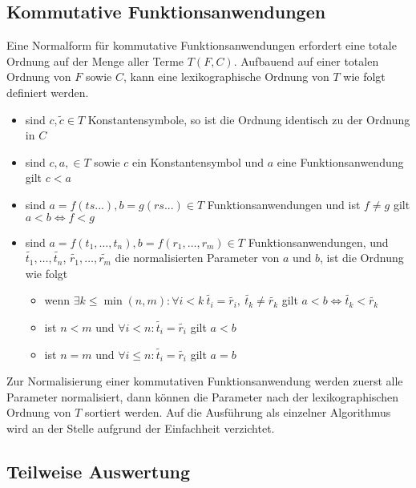 \documentclass{scrartcl}
\numberwithin{figure}{section} %
\theoremstyle{definition} %
\begin{document}
\subsection{Kommutative Funktionsanwendungen} \label{subsecNormalSortieren}
Eine Normalform für kommutative Funktionsanwendungen erfordert eine totale Ordnung auf der Menge aller Terme $T(F, C)$. Aufbauend auf einer totalen Ordnung von $F$ sowie $C$, kann eine lexikographische Ordnung von $T$ wie folgt definiert werden. 
\begin{itemize}
	\item{sind $c, \tilde{c} \in T$ Konstantensymbole, so ist die Ordnung identisch zu der Ordnung in $C$}
	\item{sind $c, a, \in T$ sowie $c$ ein Konstantensymbol und $a$ eine Funktionsanwendung gilt $c < a$ }
	\item{sind $a = f(ts...), b = g(rs...) \in T$ Funktionsanwendungen und ist $f \neq g$ gilt $a < b \iff f < g $}
	\item{sind $a = f(t_1, \dots, t_n), b = f(r_1, \dots, r_m) \in T$ Funktionsanwendungen, und $\tilde{t_1}, \dots, \tilde{t_n}$, $\tilde{r_1}, \dots, \tilde{r_m}$ die normalisierten Parameter von $a$ und $b$, ist die Ordnung wie folgt}
	\begin{itemize}
		\item{wenn $\exists k \leq \min{(n, m)} \colon \forall i < k ~ \tilde{t_i} = \tilde{r_i} ,~ \tilde{t_k} \neq \tilde{r_k} $ gilt ${a < b \iff \tilde{t_k} < \tilde{r_k}}$}
		\item{ist $n < m$ und $\forall i < n\colon \tilde{t_i} = \tilde{r_i}$ gilt $a < b$}
		\item{ist $n = m$ und $\forall i \leq n\colon \tilde{t_i} = \tilde{r_i}$ gilt $a = b$}
	\end{itemize}
\end{itemize}
Zur Normalisierung einer kommutativen Funktionsanwendung werden zuerst alle Parameter normalisiert, dann können die Parameter nach der lexikographischen Ordnung von $T$ sortiert werden. Auf die Ausführung als einzelner Algorithmus wird an der Stelle aufgrund der Einfachheit verzichtet.

\subsection{Teilweise Auswertung} \label{subsecNormalKombinieren}

\begin{algorithm}
\DontPrintSemicolon
\caption{$\mathrm{combine} \colon T \rightarrow T$}\label{combine}

\end{algorithm}
\end{document}
